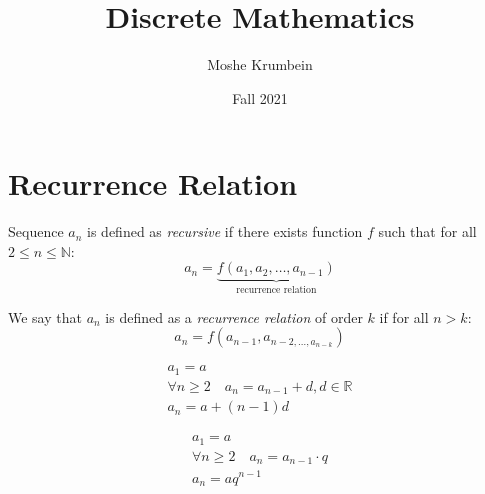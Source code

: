 \documentclass[00_complete]{subfiles}
\title{Discrete Mathematics}
\author{Moshe Krumbein}
\date{Fall 2021}
\begin{document}

\section{Recurrence Relation}
\begin{definition}[Recursion]
    Sequence $a_n$ is defined as \emph{recursive} if there exists function $f$
    such that for all $2 \leq n \leq \mathbb{N}$:
    $$a_n=\underbrace{f(a_1,a_2,\dots, a_{n-1})}_{\text{recurrence relation}}$$
\end{definition}
\begin{definition}
    We say that $a_n$ is defined as a \emph{recurrence relation} of order $k$
    if for all $n>k$:
    $$a_n=f(a_{n-1},a_{n-2,\dots,a_{n-k}})$$
\end{definition}
\begin{example}
$$
\begin{gathered}
    a_1=a \\
    \forall n \geq 2 \quad a_n = a_{n-1}+d,d \in \mathbb{R} \\
    a_n = a+ (n-1)d
\end{gathered}
$$
\end{example}
\begin{example}
$$
\begin{gathered}
    a_1=a \\
    \forall n \geq 2 \quad a_n = a_{n-1} \cdot q \\
    a_n = aq^{n-1}
\end{gathered}
$$
\end{example}
\end{document}
